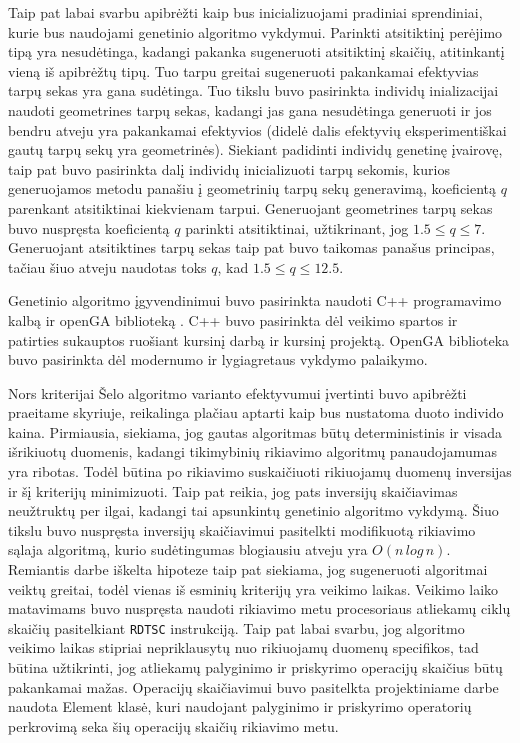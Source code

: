 \documentclass{VUMIFInfBakalaurinis}
\begin{document}
Taip pat labai svarbu apibrėžti kaip bus inicializuojami pradiniai sprendiniai, kurie bus naudojami genetinio algoritmo vykdymui.
Parinkti atsitiktinį perėjimo tipą yra nesudėtinga, kadangi pakanka sugeneruoti atsitiktinį skaičių, atitinkantį vieną iš apibrėžtų tipų.
Tuo tarpu greitai sugeneruoti pakankamai efektyvias tarpų sekas yra gana sudėtinga.
Tuo tikslu buvo pasirinkta individų inializacijai naudoti geometrines tarpų sekas, kadangi jas gana nesudėtinga generuoti
ir jos bendru atveju yra pakankamai efektyvios (didelė dalis efektyvių eksperimentiškai gautų tarpų sekų yra geometrinės).
Siekiant padidinti individų genetinę įvairovę, taip pat buvo pasirinkta dalį individų inicializuoti
tarpų sekomis, kurios generuojamos metodu panašiu į geometrinių tarpų sekų generavimą, koeficientą $q$ parenkant atsitiktinai kiekvienam tarpui.
Generuojant geometrines tarpų sekas buvo nuspręsta koeficientą $q$ parinkti atsitiktinai, užtikrinant, jog $1.5 \leq q \leq 7$.
Generuojant atsitiktines tarpų sekas taip pat buvo taikomas panašus principas, tačiau šiuo atveju naudotas toks $q$, kad $1.5 \leq q \leq 12.5$.

Genetinio algoritmo įgyvendinimui buvo pasirinkta naudoti C++ programavimo kalbą ir openGA biblioteką \cite{mohammadi2017openga}.
C++ buvo pasirinkta dėl veikimo spartos ir patirties sukauptos ruošiant kursinį darbą ir kursinį projektą.
OpenGA biblioteka buvo pasirinkta dėl modernumo ir lygiagretaus vykdymo palaikymo.

Nors kriterijai Šelo algoritmo varianto efektyvumui įvertinti buvo apibrėžti praeitame skyriuje,
reikalinga plačiau aptarti kaip bus nustatoma duoto individo kaina.
Pirmiausia, siekiama, jog gautas algoritmas būtų deterministinis ir visada išrikiuotų duomenis, kadangi tikimybinių rikiavimo algoritmų panaudojamumas yra ribotas.
Todėl būtina po rikiavimo suskaičiuoti rikiuojamų duomenų inversijas ir šį kriterijų minimizuoti.
Taip pat reikia, jog pats inversijų skaičiavimas neužtruktų per ilgai, kadangi tai apsunkintų genetinio algoritmo vykdymą.
Šiuo tikslu buvo nuspręsta inversijų skaičiavimui pasitelkti modifikuotą rikiavimo sąlaja algoritmą, kurio sudėtingumas blogiausiu atveju yra $O(n\,log\,n)$.
Remiantis darbe iškelta hipoteze taip pat siekiama, jog sugeneruoti algoritmai veiktų greitai, todėl
vienas iš esminių kriterijų yra veikimo laikas.
Veikimo laiko matavimams buvo nuspręsta naudoti rikiavimo metu procesoriaus atliekamų ciklų skaičių pasitelkiant \verb|RDTSC| instrukciją.
Taip pat labai svarbu, jog algoritmo veikimo laikas stipriai nepriklausytų nuo rikiuojamų duomenų specifikos, tad 
būtina užtikrinti, jog atliekamų palyginimo ir priskyrimo operacijų skaičius būtų pakankamai mažas.
Operacijų skaičiavimui buvo pasitelkta projektiniame darbe naudota Element klasė, kuri naudojant palyginimo ir priskyrimo operatorių
perkrovimą seka šių operacijų skaičių rikiavimo metu.
\end{document}
